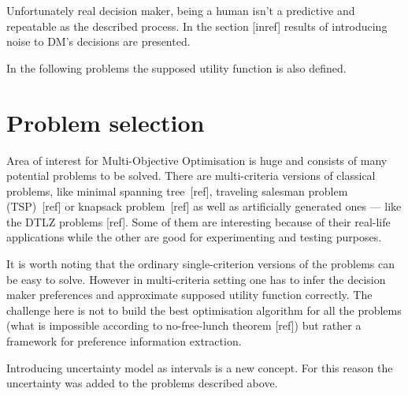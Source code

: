 Unfortunately real decision maker, being a human isn't a predictive and
repeatable as the described process. In the section [inref] results of
introducing noise to DM's decisions are presented.

In the following problems the supposed utility function is also defined.

\section{Problem selection}

Area of interest for Multi-Objective Optimisation is huge and consists of many
potential problems to be solved. There are multi-criteria versions of
classical problems, like minimal spanning tree~[ref], traveling salesman
problem (TSP)~[ref] or knapsack problem~[ref] as well as artificially
generated ones --- like the DTLZ problems [ref]. Some of them are interesting
because of their real-life applications while the other are good for
experimenting and testing purposes.

It is worth noting that the ordinary single-criterion versions of the problems
can be easy to solve. However in multi-criteria setting one has to infer the
decision maker preferences and approximate supposed utility function
correctly. The challenge here is not to build the best optimisation algorithm
for all the problems (what is impossible according to no-free-lunch theorem
[ref]) but rather a framework for preference information extraction.

Introducing uncertainty model as intervals is a new concept. For this reason
the uncertainty was added to the problems described above.


